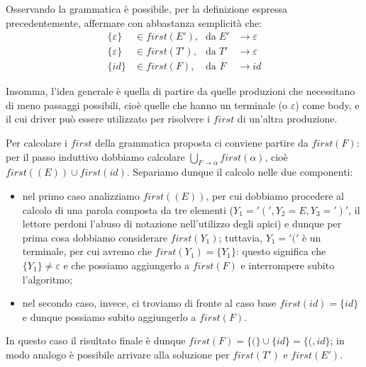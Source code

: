 \documentclass[class=book, crop=false, oneside, 12pt]{standalone}
\begin{document}
Osservando la grammatica è possibile, per la definizione espressa precedentemente, affermare con abbastanza semplicità che: 
\begin{align*}
    \{\varepsilon\} &\in first(E')\textrm{,} &\textrm{da}\; E' &\to \varepsilon \\
    \{\varepsilon\} &\in first(T')\textrm{,} &\textrm{da}\; T' &\to \varepsilon \\
    \{id\} &\in first(F)\textrm{,} &\textrm{da } F\; &\to id
\end{align*}

Insomma, l'idea generale è quella di partire da quelle produzioni che necessitano di meno passaggi possibili, cioè quelle che hanno un terminale (o \(\varepsilon\)) come body, e il cui driver può essere utilizzato per risolvere i \(first\) di un'altra produzione.

Per calcolare i \(first\) della grammatica proposta ci conviene partire da \(first(F)\): per il passo induttivo dobbiamo calcolare \(\bigcup_{F \to \alpha} first(\alpha)\), cioè \(first((E)) \cup first(id)\). Separiamo dunque il calcolo nelle due componenti:
\begin{itemize}
    \item nel primo caso analizziamo \(first((E))\), per cui dobbiamo procedere al calcolo di una parola composta da tre elementi (\(Y_1 = '(', Y_2 = E, Y_3 = ')'\), il lettore perdoni l'abuso di notazione nell'utilizzo degli apici) e dunque per prima cosa dobbiamo considerare \(first(Y_1)\); tuttavia, \(Y_1 = '('\) è un terminale, per cui avremo che \(first(Y_1) = \{Y_1\}\): questo significa che \(\{Y_1\} \neq \varepsilon\) e che possiamo aggiungerlo a \(first(F)\) e interrompere subito l'algoritmo;
    \item nel secondo caso, invece, ci troviamo di fronte al caso base \(first(id) = \{id\}\) e dunque possiamo subito aggiungerlo a \(first(F)\).
\end{itemize}
In questo caso il risultato finale è dunque \(first(F) = \{(\} \cup \{id\} = \{(, id\}\); in modo analogo è possibile arrivare alla soluzione per \(first(T')\) e \(first(E')\).
\end{document}
